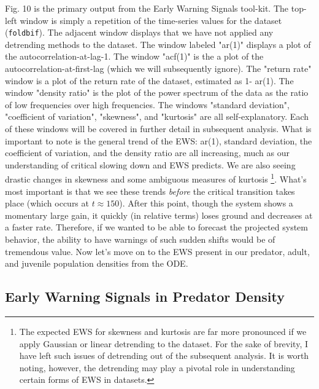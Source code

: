\documentclass[12pt]{article}
\begin{document}
Fig. 10 is the primary output from the Early Warning Signals tool-kit. The top-left window is simply a repetition of the time-series values for the dataset (\texttt{foldbif}). The adjacent window displays that we have not applied any detrending methods to the dataset. The window labeled "ar(1)" displays a plot of the autocorrelation-at-lag-1. The window "acf(1)" is the a plot of the autocorrelation-at-first-lag (which we will subsequently ignore). The "return rate" window is a plot of the return rate of the dataset, estimated as 1- ar(1). The window "density ratio" is the plot of the power spectrum of the data as the ratio of low frequencies over high frequencies. The windows "standard deviation", "coefficient of variation", "skewness", and "kurtosis" are all self-explanatory. Each of these windows will be covered in further detail in subsequent analysis. What is important to note is the general trend of the EWS: ar(1), standard deviation, the coefficient of variation, and the density ratio are all increasing, much as our understanding of critical slowing down and EWS predicts. We are also seeing drastic changes in skewness and some ambiguous measures of kurtosis \footnote{The expected EWS for skewness and kurtosis are far more pronounced if we apply Gaussian or linear detrending to the dataset. For the sake of brevity, I have left such issues of detrending out of the subsequent analysis. It is worth noting, however, the detrending may play a pivotal role in understanding certain forms of EWS in datasets.}.  What's most important is that we see these trends \emph{before} the critical transition takes place (which occurs at $t\approx 150$). After this point, though the system shows a momentary large gain, it quickly (in relative terms) loses ground and decreases at a faster rate. Therefore, if we wanted to be able to forecast the projected system behavior, the ability to have warnings of such sudden shifts would be of tremendous value. Now let's move on to the EWS present in our predator, adult, and juvenile population densities from the ODE. 

\subsection{Early Warning Signals in Predator Density}
\end{document}
